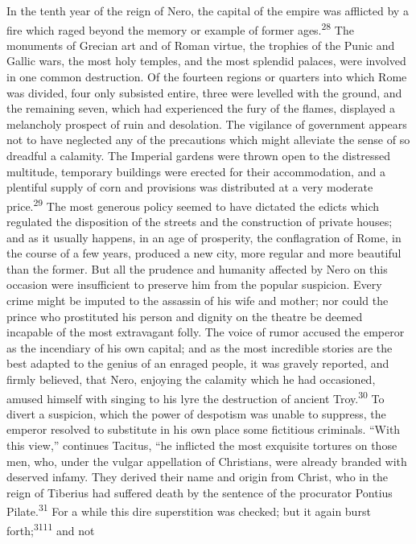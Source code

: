 In the tenth year of the reign of Nero, the capital of the empire
was afflicted by a fire which raged beyond the memory or example
of former ages.\textsuperscript{28} The monuments of Grecian art and of Roman
virtue, the trophies of the Punic and Gallic wars, the most holy
temples, and the most splendid palaces, were involved in one
common destruction. Of the fourteen regions or quarters into
which Rome was divided, four only subsisted entire, three were
levelled with the ground, and the remaining seven, which had
experienced the fury of the flames, displayed a melancholy
prospect of ruin and desolation. The vigilance of government
appears not to have neglected any of the precautions which might
alleviate the sense of so dreadful a calamity. The Imperial
gardens were thrown open to the distressed multitude, temporary
buildings were erected for their accommodation, and a plentiful
supply of corn and provisions was distributed at a very moderate
price.\textsuperscript{29} The most generous policy seemed to have dictated the
edicts which regulated the disposition of the streets and the
construction of private houses; and as it usually happens, in an
age of prosperity, the conflagration of Rome, in the course of a
few years, produced a new city, more regular and more beautiful
than the former. But all the prudence and humanity affected by
Nero on this occasion were insufficient to preserve him from the
popular suspicion. Every crime might be imputed to the assassin
of his wife and mother; nor could the prince who prostituted his
person and dignity on the theatre be deemed incapable of the most
extravagant folly. The voice of rumor accused the emperor as the
incendiary of his own capital; and as the most incredible stories
are the best adapted to the genius of an enraged people, it was
gravely reported, and firmly believed, that Nero, enjoying the
calamity which he had occasioned, amused himself with singing to
his lyre the destruction of ancient Troy.\textsuperscript{30} To divert a
suspicion, which the power of despotism was unable to suppress,
the emperor resolved to substitute in his own place some
fictitious criminals. “With this view,” continues Tacitus, “he
inflicted the most exquisite tortures on those men, who, under
the vulgar appellation of Christians, were already branded with
deserved infamy. They derived their name and origin from Christ,
who in the reign of Tiberius had suffered death by the sentence
of the procurator Pontius Pilate.\textsuperscript{31} For a while this dire
superstition was checked; but it again burst forth;\textsuperscript{3111} and not
